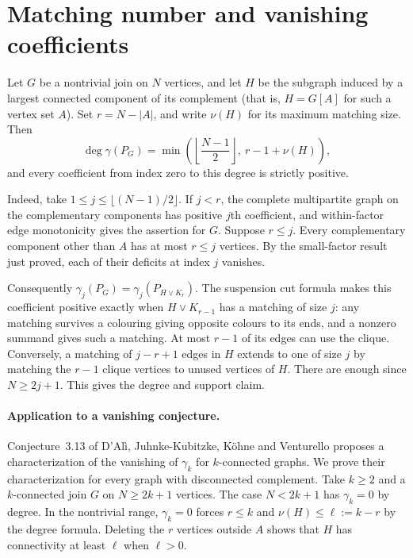 \documentclass[11pt,a4paper]{article}
\theoremstyle{definition}\newtheorem{problem}[theorem]{Problem}
\begin{document}
\section{Matching number and vanishing coefficients}
Let $G$ be a nontrivial join on $N$ vertices, and let $H$ be the subgraph induced by a largest connected component of its complement (that is, $H=G[A]$ for such a vertex set $A$). Set $r=N-|A|$, and write $\nu(H)$ for its maximum matching size. Then
\[
 \deg\gamma(P_G)=\min\!\left(\left\lfloor\frac{N-1}{2}\right\rfloor,\ r-1+\nu(H)\right),
\]
and every coefficient from index zero to this degree is strictly positive.

Indeed, take $1\le j\le\lfloor(N-1)/2\rfloor$. If $j<r$, the complete multipartite graph on the complementary components has positive $j$th coefficient, and within-factor edge monotonicity gives the assertion for $G$. Suppose $r\le j$. Every complementary component other than $A$ has at most $r\le j$ vertices. By the small-factor result just proved, each of their deficits at index $j$ vanishes.

Consequently $\gamma_j(P_G)=\gamma_j(P_{H\vee K_r})$. The suspension cut formula makes this coefficient positive exactly when $H\vee K_{r-1}$ has a matching of size $j$: any matching survives a colouring giving opposite colours to its ends, and a nonzero summand gives such a matching. At most $r-1$ of its edges can use the clique. Conversely, a matching of $j-r+1$ edges in $H$ extends to one of size $j$ by matching the $r-1$ clique vertices to unused vertices of $H$. There are enough since $N\ge 2j+1$. This gives the degree and support claim.

\paragraph{Application to a vanishing conjecture.} Conjecture~3.13 of D'Al\`i, Juhnke-Kubitzke, K\"ohne and Venturello \cite{DJKV} proposes a characterization of the vanishing of $\gamma_k$ for $k$-connected graphs. We prove their characterization for every graph with disconnected complement. Take $k\ge2$ and a $k$-connected join $G$ on $N\ge 2k+1$ vertices. The case $N<2k+1$ has $\gamma_k=0$ by degree. In the nontrivial range, $\gamma_k=0$ forces $r\le k$ and $\nu(H)\le \ell:=k-r$ by the degree formula. Deleting the $r$ vertices outside $A$ shows that $H$ has connectivity at least $\ell$ when $\ell>0$.
\end{document}
